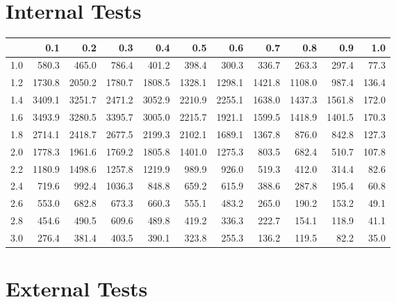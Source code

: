 \section{Internal Tests}

\begin{tabular}{r|rrrrrrrrrr}
  \hline
 & 0.1 & 0.2 & 0.3 & 0.4 & 0.5 & 0.6 & 0.7 & 0.8 & 0.9 & 1.0 \\ 
  \hline
1.0 & 580.3 & 465.0 & 786.4 & 401.2 & 398.4 & 300.3 & 336.7 & 263.3 & 297.4 & 77.3 \\ 
  1.2 & 1730.8 & 2050.2 & 1780.7 & 1808.5 & 1328.1 & 1298.1 & 1421.8 & 1108.0 & 987.4 & 136.4 \\ 
  1.4 & 3409.1 & 3251.7 & 2471.2 & 3052.9 & 2210.9 & 2255.1 & 1638.0 & 1437.3 & 1561.8 & 172.0 \\ 
  1.6 & 3493.9 & 3280.5 & 3395.7 & 3005.0 & 2215.7 & 1921.1 & 1599.5 & 1418.9 & 1401.5 & 170.3 \\ 
  1.8 & 2714.1 & 2418.7 & 2677.5 & 2199.3 & 2102.1 & 1689.1 & 1367.8 & 876.0 & 842.8 & 127.3 \\ 
  2.0 & 1778.3 & 1961.6 & 1769.2 & 1805.8 & 1401.0 & 1275.3 & 803.5 & 682.4 & 510.7 & 107.8 \\ 
  2.2 & 1180.9 & 1498.6 & 1257.8 & 1219.9 & 989.9 & 926.0 & 519.3 & 412.0 & 314.4 & 82.6 \\ 
  2.4 & 719.6 & 992.4 & 1036.3 & 848.8 & 659.2 & 615.9 & 388.6 & 287.8 & 195.4 & 60.8 \\ 
  2.6 & 553.0 & 682.8 & 673.3 & 660.3 & 555.1 & 483.2 & 265.0 & 190.2 & 153.2 & 49.1 \\ 
  2.8 & 454.6 & 490.5 & 609.6 & 489.8 & 419.2 & 336.3 & 222.7 & 154.1 & 118.9 & 41.1 \\ 
  3.0 & 276.4 & 381.4 & 403.5 & 390.1 & 323.8 & 255.3 & 136.2 & 119.5 & 82.2 & 35.0 \\ 
   \hline
\end{tabular}



\section{External Tests}